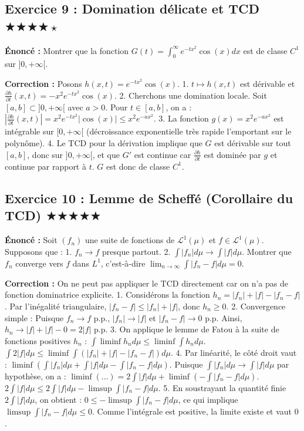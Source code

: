 \documentclass[11pt,a4paper]{article}
\begin{document}
\subsection*{Exercice 9 : Domination délicate et TCD \quad $\bigstar\bigstar\bigstar\bigstar\star$}

\textbf{Énoncé :}
Montrer que la fonction $G(t) = \int_0^\infty e^{-tx^2} \cos(x) dx$ est de classe $C^1$ sur $]0, +\infty[$.

\textbf{Correction :}
Posons $h(x, t) = e^{-tx^2} \cos(x)$.
1. $t \mapsto h(x, t)$ est dérivable et $\frac{\partial h}{\partial t}(x, t) = -x^2 e^{-tx^2} \cos(x)$.
2. Cherchons une domination locale. Soit $[a, b] \subset ]0, +\infty[$ avec $a > 0$.
   Pour $t \in [a, b]$, on a :
   $\left| \frac{\partial h}{\partial t}(x, t) \right| = x^2 e^{-tx^2} |\cos(x)| \le x^2 e^{-ax^2}$.
3. La fonction $g(x) = x^2 e^{-ax^2}$ est intégrable sur $[0, +\infty[$ (décroissance exponentielle très rapide l'emportant sur le polynôme).
4. Le TCD pour la dérivation implique que $G$ est dérivable sur tout $[a, b]$, donc sur $]0, +\infty[$, et que $G'$ est continue car $\frac{\partial h}{\partial t}$ est dominée par $g$ et continue par rapport à $t$. $G$ est donc de classe $C^1$.


\subsection*{Exercice 10 : Lemme de Scheffé (Corollaire du TCD) \quad $\bigstar\bigstar\bigstar\bigstar\bigstar$}

\textbf{Énoncé :}
Soit $(f_n)$ une suite de fonctions de $\mathcal{L}^1(\mu)$ et $f \in \mathcal{L}^1(\mu)$.
Supposons que :
1. $f_n \to f$ presque partout.
2. $\int |f_n| d\mu \to \int |f| d\mu$.
Montrer que $f_n$ converge vers $f$ dans $L^1$, c'est-à-dire $\lim_{n \to \infty} \int |f_n - f| d\mu = 0$.

\textbf{Correction :}
On ne peut pas appliquer le TCD directement car on n'a pas de fonction dominatrice explicite.
1. Considérons la fonction $h_n = |f_n| + |f| - |f_n - f|$.
   Par l'inégalité triangulaire, $|f_n - f| \le |f_n| + |f|$, donc $h_n \ge 0$.
2. Convergence simple : Puisque $f_n \to f$ p.p., $|f_n| \to |f|$ et $|f_n - f| \to 0$ p.p.
   Ainsi, $h_n \to |f| + |f| - 0 = 2|f|$ p.p.
3. On applique le lemme de Fatou à la suite de fonctions positives $h_n$ :
   $\int \liminf h_n d\mu \le \liminf \int h_n d\mu$.
   $\int 2|f| d\mu \le \liminf \int (|f_n| + |f| - |f_n - f|) d\mu$.
4. Par linéarité, le côté droit vaut :
   $\liminf \left( \int |f_n| d\mu + \int |f| d\mu - \int |f_n - f| d\mu \right)$.
   Puisque $\int |f_n| d\mu \to \int |f| d\mu$ par hypothèse, on a :
   $\liminf (\dots) = 2\int |f| d\mu + \liminf \left( - \int |f_n - f| d\mu \right)$.
   $2\int |f| d\mu \le 2\int |f| d\mu - \limsup \int |f_n - f| d\mu$.
5. En soustrayant la quantité finie $2\int |f| d\mu$, on obtient :
   $0 \le - \limsup \int |f_n - f| d\mu$, ce qui implique $\limsup \int |f_n - f| d\mu \le 0$.
   Comme l'intégrale est positive, la limite existe et vaut $0$.
\end{document}

